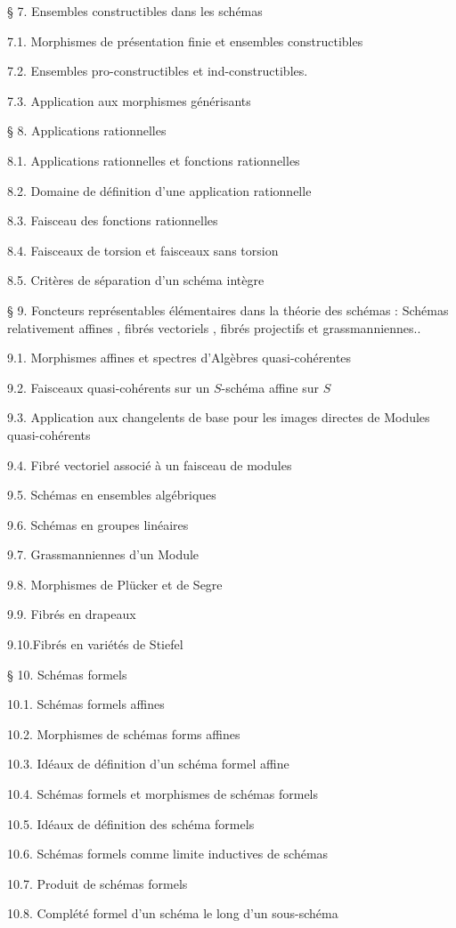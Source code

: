 
\noindent § 7. Ensembles constructibles dans les schémas\dotfill

7.1. Morphismes de présentation finie et ensembles constructibles\dotfill

7.2. Ensembles pro-constructibles et ind-constructibles.

7.3. Application aux morphismes générisants\dotfill

\noindent § 8. Applications rationnelles \dotfill

8.1. Applications rationnelles et fonctions rationnelles

8.2. Domaine de définition d'une application rationnelle

8.3. Faisceau des fonctions rationnelles\dotfill

8.4. Faisceaux de torsion et faisceaux sans torsion\dotfill

8.5. Critères de séparation d'un schéma intègre\dotfill

\noindent § 9. Foncteurs représentables élémentaires dans la théorie des schémas : Schémas relativement affines , fibrés vectoriels , fibrés projectifs et grassmanniennes..

9.1. Morphismes affines et spectres d'Algèbres quasi-cohérentes\dotfill

9.2. Faisceaux quasi-cohérents sur un $S$-schéma affine sur $S$\dotfill

9.3. Application aux changelents de base pour les images directes de Modules quasi-cohérents\dotfill

9.4. Fibré vectoriel associé à un faisceau de modules\dotfill

9.5. Schémas en ensembles algébriques\dotfill

9.6. Schémas en groupes linéaires\dotfill

9.7. Grassmanniennes d'un Module\dotfill

9.8. Morphismes de Plücker et de Segre\dotfill

9.9. Fibrés en drapeaux\dotfill

9.10.Fibrés en variétés de Stiefel\dotfill

\noindent § 10. Schémas formels\dotfill

10.1. Schémas formels affines\dotfill

10.2. Morphismes de schémas forms affines\dotfill

10.3. Idéaux de définition d'un schéma formel affine\dotfill

10.4. Schémas formels et morphismes de schémas formels\dotfill

10.5. Idéaux de définition des schéma formels\dotfill

10.6. Schémas formels comme limite inductives de schémas

10.7. Produit de schémas formels\dotfill

10.8. Complété formel d'un schéma le long d'un sous-schéma\dotfill
